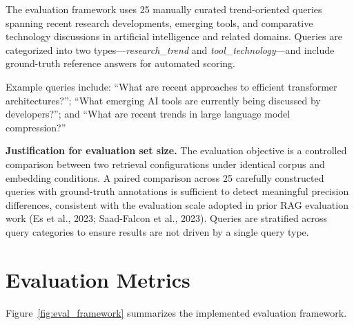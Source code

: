 \documentclass[12pt,a4paper]{report}
\begin{document}
The evaluation framework uses 25 manually curated trend-oriented queries spanning recent research developments, emerging tools, and comparative technology discussions in artificial intelligence and related domains. Queries are categorized into two types---\textit{research\_trend} and \textit{tool\_technology}---and include ground-truth reference answers for automated scoring.

Example queries include: ``What are recent approaches to efficient transformer architectures?''; ``What emerging AI tools are currently being discussed by developers?''; and ``What are recent trends in large language model compression?''

\textbf{Justification for evaluation set size.} The evaluation objective is a controlled comparison between two retrieval configurations under identical corpus and embedding conditions. A paired comparison across 25 carefully constructed queries with ground-truth annotations is sufficient to detect meaningful precision differences, consistent with the evaluation scale adopted in prior RAG evaluation work (Es et al., 2023; Saad-Falcon et al., 2023). Queries are stratified across query categories to ensure results are not driven by a single query type.

\section{Evaluation Metrics}
\label{sec:eval_metrics}

Figure~\ref{fig:eval_framework} summarizes the implemented evaluation framework.
\end{document}
